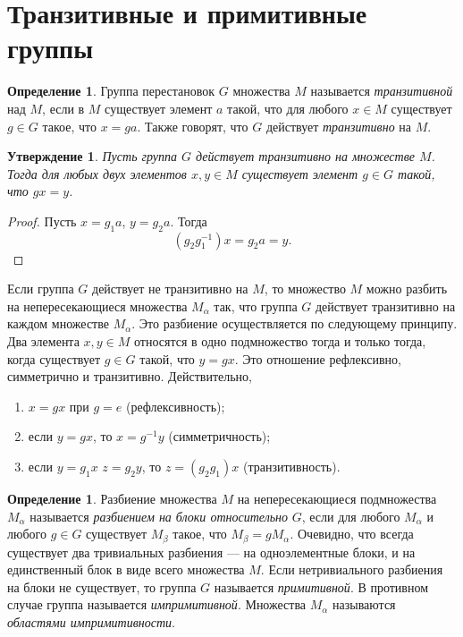 \documentclass[12pt, titlepage, oneside]{amsbook}
\newtheorem{claim}[theorem]{Утверждение}
\theoremstyle{definition}
\newtheorem{definition}[theorem]{Определение}
\theoremstyle{remark}
\begin{document}
\section{Транзитивные и примитивные группы}

\begin{definition}
Группа перестановок $G$ множества $M$ называется \emph{транзитивной} над $M$, если в $M$ существует элемент $a$ такой, что для любого $x\in M$ существует $g\in G$ такое, что $x=g a$. Также говорят, что $G$ действует \emph{транзитивно} на $M$.
\end{definition}

\begin{claim}
\label{Tr1}
Пусть группа $G$ действует транзитивно на множестве $M$. Тогда для любых двух элементов $x,y\in M$ существует элемент $g\in G$ такой, что $g x=y$.
\end{claim}

\begin{proof}
Пусть $x=g_1 a$, $y=g_2 a$. Тогда $$(g_2g^{-1}_1)x=g_2 a=y.$$
\end{proof}

Если группа $G$ действует не транзитивно на $M$, то множество $M$ можно разбить на непересекающиеся множества $M_\alpha$ так, что группа $G$ действует транзитивно на каждом множестве $M_\alpha$. Это разбиение осуществляется по следующему принципу. Два элемента $x,y\in M$ относятся в одно подмножество тогда и только тогда, когда существует $g\in G$ такой, что $y=g x$. Это отношение рефлексивно, симметрично и транзитивно. Действительно,
\begin{enumerate}
\item $x=g x$ при $g=e$ (рефлексивность);
\item если $y=g x$, то $x=g^{-1} y$ (симметричность);
\item если $y=g_1 x$ $z=g_2 y$, то $z=(g_2 g_1)x$ (транзитивность).
\end{enumerate}

\begin{definition}
Разбиение множества $M$ на непересекающиеся подмножества $M_\alpha$ называется \emph{разбиением на блоки относительно} $G$, если для любого $M_\alpha$ и любого $g\in G$ существует $M_\beta$ такое, что $M_\beta=g M_\alpha$. Очевидно, что всегда существует два тривиальных разбиения --- на одноэлементные блоки, и на единственный блок в виде всего множества $M$. Если нетривиального разбиения на блоки не существует, то группа $G$ называется \emph{примитивной}. В противном случае группа называется \emph{импримитивной}. Множества $M_\alpha$ называются \emph{областями импримитивности}.
\end{definition}
\end{document}

